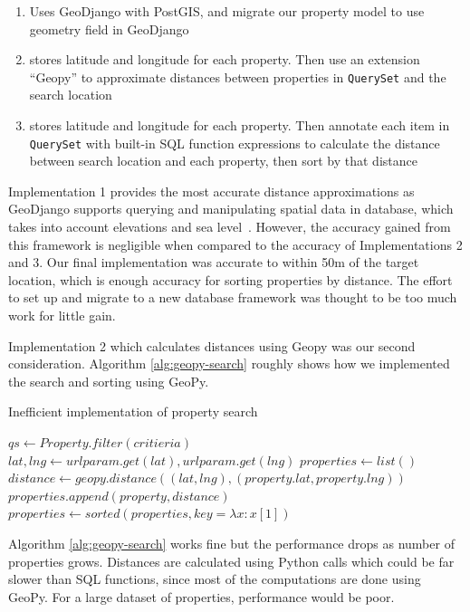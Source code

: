\begin{enumerate}
  \item Uses GeoDjango with PostGIS, and migrate our property model to use
    geometry field in GeoDjango
  \item stores latitude and longitude for each property. Then use an extension
    ``Geopy'' to approximate distances between properties in \texttt{QuerySet}
    and the search location~\parencite{geopy-doc}
  \item stores latitude and longitude for each property. Then annotate each item
    in \texttt{QuerySet} with built-in SQL function expressions to calculate the
    distance between search location and each property, then sort by that
    distance
\end{enumerate}

Implementation 1 provides the most accurate distance approximations as GeoDjango supports
querying and manipulating spatial data in database, which takes into account
elevations and sea level~\parencite{geodjango-raster-lookups}. However, the
accuracy gained from this framework is negligible when compared to the accuracy
of Implementations 2 and 3. Our final implementation was accurate to within 50m of the
target location, which is enough accuracy for sorting properties by distance.
The effort to set up and migrate to a new database framework was thought to be
too much work for little gain.

Implementation 2 which calculates distances using Geopy was our second consideration.
Algorithm \ref{alg:geopy-search} roughly shows how we implemented the search and sorting
using GeoPy.

\begin{algorithm}
  \caption{Inefficient implementation of property search}\label{alg:geopy-search}
  \begin{algorithmic}
    \STATE $qs\gets Property.filter(critieria)$
    \STATE $lat, lng\gets urlparam.get(lat), urlparam.get(lng)$
    \STATE $properties\gets list()$
    \STATE $distance\gets geopy.distance((lat, lng), (property.lat, property.lng))$
    \STATE $properties.append(property, distance)$
    \ENDFOR
    \STATE $properties\gets sorted(properties, key=\lambda x: x[1])$
  \end{algorithmic}
\end{algorithm}

Algorithm \ref{alg:geopy-search} works fine but the performance drops
as number of properties grows. Distances are
calculated using Python calls which could be far slower than SQL functions,
since most of the computations are done using GeoPy. For a large dataset of properties,
performance would be poor.

